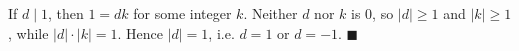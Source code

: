 If $d\mid1$, then $1=dk$ for some integer $k$. Neither $d$ nor $k$ is $0$, so $|d|\ge1$ and $|k|\ge1$, while $|d|\cdot|k|=1$. Hence $|d|=1$, i.e. $d=1$ or $d=-1$. $\blacksquare$
